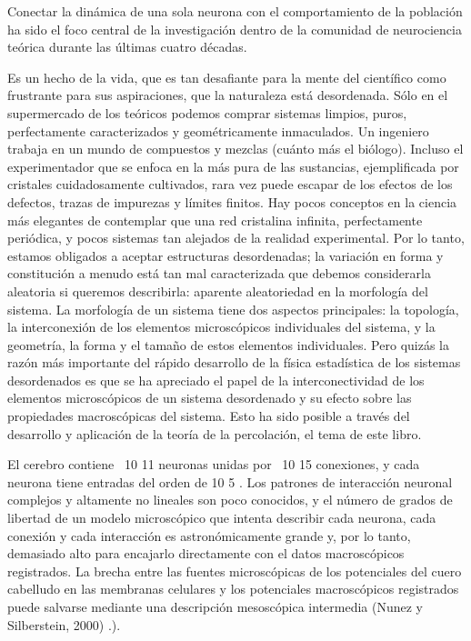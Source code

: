 Conectar la dinámica de una sola neurona con el comportamiento de la población ha sido el foco central de la investigación dentro de la comunidad de neurociencia teórica durante las últimas cuatro décadas.



Es un hecho de la vida, que es tan desafiante para la mente del científico como frustrante para sus aspiraciones, que la naturaleza está desordenada. Sólo en el supermercado de los teóricos podemos comprar sistemas limpios, puros, perfectamente caracterizados y geométricamente inmaculados. Un ingeniero trabaja en un mundo de compuestos y mezclas (cuánto más el biólogo). Incluso el experimentador que se enfoca en la más pura de las sustancias, ejemplificada por cristales cuidadosamente cultivados, rara vez puede escapar de los efectos de los defectos, trazas de impurezas y límites finitos. Hay pocos conceptos en la ciencia más elegantes de contemplar que una red cristalina infinita, perfectamente periódica, y pocos sistemas tan alejados de la realidad experimental. Por lo tanto, estamos obligados a aceptar estructuras desordenadas; la variación en forma y constitución a menudo está tan mal caracterizada que debemos considerarla aleatoria si queremos describirla: aparente aleatoriedad en la morfología del sistema. La morfología de un sistema tiene dos aspectos principales: la topología, la interconexión de los elementos microscópicos individuales del sistema, y la geometría, la forma y el tamaño de estos elementos individuales. Pero quizás la razón más importante del rápido desarrollo de la física estadística de los sistemas desordenados es que se ha apreciado el papel de la interconectividad de los elementos microscópicos de un sistema desordenado y su efecto sobre las propiedades macroscópicas del sistema. Esto ha sido posible a través del desarrollo y aplicación de la teoría de la percolación, el tema de este libro.


El cerebro contiene ~10 11 neuronas unidas por ~10 15 conexiones, y cada neurona tiene entradas del orden de 10 5 . Los patrones de interacción neuronal complejos y altamente no lineales son poco conocidos, y el número de grados de libertad de un modelo microscópico que intenta describir cada neurona, cada conexión y cada interacción es astronómicamente grande y, por lo tanto, demasiado alto para encajarlo directamente con el datos macroscópicos registrados. La brecha entre las fuentes microscópicas de los potenciales del cuero cabelludo en las membranas celulares y los potenciales macroscópicos registrados puede salvarse mediante una descripción mesoscópica intermedia (Nunez y Silberstein, 2000) .).



